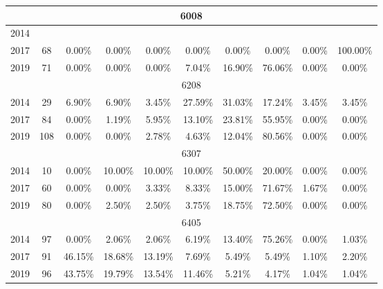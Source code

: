 \begin{table}[H]
\begin{tabular}{|l|c|ccc|ccc|cc|}
\hline
\hline
\multicolumn{10}{|c|}{6008}\\
\hline
2014 & & & & & & & & & \\
2017 & 68 & 0.00\% & 0.00\% & 0.00\% & 0.00\% & 0.00\% & 0.00\% & 0.00\% & 100.00\%\\
2019 & 71 & 0.00\% & 0.00\% & 0.00\% & 7.04\% & 16.90\% & 76.06\% & 0.00\% & 0.00\%\\
\hline
\hline
\multicolumn{10}{|c|}{6208}\\
\hline
2014 & 29 & 6.90\% & 6.90\% & 3.45\% & 27.59\% & 31.03\% & 17.24\% & 3.45\% & 3.45\%\\
2017 & 84 & 0.00\% & 1.19\% & 5.95\% & 13.10\% & 23.81\% & 55.95\% & 0.00\% & 0.00\%\\
2019 & 108 & 0.00\% & 0.00\% & 2.78\% & 4.63\% & 12.04\% & 80.56\% & 0.00\% & 0.00\%\\
\hline
\hline
\multicolumn{10}{|c|}{6307}\\
\hline
2014 & 10 & 0.00\% & 10.00\% & 10.00\% & 10.00\% & 50.00\% & 20.00\% & 0.00\% & 0.00\%\\
2017 & 60 & 0.00\% & 0.00\% & 3.33\% & 8.33\% & 15.00\% & 71.67\% & 1.67\% & 0.00\%\\
2019 & 80 & 0.00\% & 2.50\% & 2.50\% & 3.75\% & 18.75\% & 72.50\% & 0.00\% & 0.00\%\\
\hline
\hline
\multicolumn{10}{|c|}{6405}\\
\hline
2014 & 97 & 0.00\% & 2.06\% & 2.06\% & 6.19\% & 13.40\% & 75.26\% & 0.00\% & 1.03\%\\
2017 & 91 & 46.15\% & 18.68\% & 13.19\% & 7.69\% & 5.49\% & 5.49\% & 1.10\% & 2.20\%\\
2019 & 96 & 43.75\% & 19.79\% & 13.54\% & 11.46\% & 5.21\% & 4.17\% & 1.04\% & 1.04\%\\
\hline
\bottomrule
\end{tabular}
\end{table}
